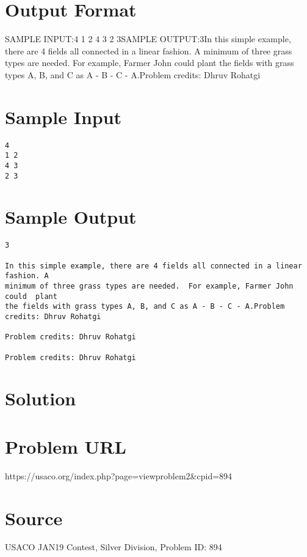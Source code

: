 \documentclass[12pt]{article}
\begin{document}
\section*{Output Format}
SAMPLE INPUT:4
1 2
4 3
2 3SAMPLE OUTPUT:3In this simple example, there are 4 fields all connected in a linear fashion. A
minimum of three grass types are needed.  For example, Farmer John could  plant
the fields with grass types A, B, and C as A - B - C - A.Problem credits: Dhruv Rohatgi

\section*{Sample Input}
\begin{verbatim}
4
1 2
4 3
2 3
\end{verbatim}

\section*{Sample Output}
\begin{verbatim}
3

In this simple example, there are 4 fields all connected in a linear fashion. A
minimum of three grass types are needed.  For example, Farmer John could  plant
the fields with grass types A, B, and C as A - B - C - A.Problem credits: Dhruv Rohatgi

Problem credits: Dhruv Rohatgi

Problem credits: Dhruv Rohatgi
\end{verbatim}

\section*{Solution}


\section*{Problem URL}
https://usaco.org/index.php?page=viewproblem2&cpid=894

\section*{Source}
USACO JAN19 Contest, Silver Division, Problem ID: 894
\end{document}
